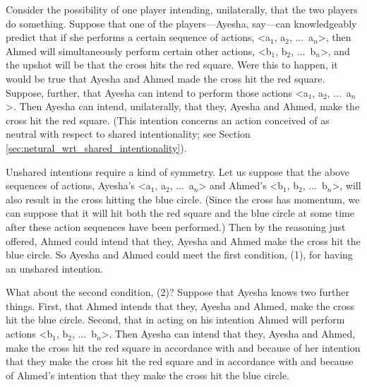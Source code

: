 \documentclass[12pt,\papersize]{extarticle}
\begin{document}
Consider the possibility of one player intending, unilaterally, that the two players do something.
Suppose that one of the players---Ayesha, say---can knowledgeably predict that if she performs a certain sequence of actions, <a$_1$, a$_2$, ...\ a$_n$>, then Ahmed will simultaneously perform certain other actions, <b$_1$, b$_2$, ...\ b$_n$>,
 and the upshot will be that the cross hits the red square.
Were this to happen, it would be true that Ayesha and Ahmed made the cross hit the red square.
Suppose, further, that Ayesha can intend to perform those actions <a$_1$, a$_2$, ...\ a$_n$>.
Then Ayesha can intend, unilaterally, that they, Ayesha and Ahmed, make the cross hit the red square.
(This intention concerns an action conceived of as neutral with respect to shared intentionality; see  Section \vref{sec:netural_wrt_shared_intentionality}).

Unshared intentions require a kind of symmetry.
Let us suppose that the above sequences of actions,
	Ayesha's <a$_1$, a$_2$, ...\ a$_n$>  and 
	Ahmed's <b$_1$, b$_2$, ...\ b$_n$>,
will also result in the cross hitting the blue circle. 
(Since the cross has momentum, we can suppose that it will hit both the red square and the blue circle at some time after these action sequences have been performed.)
Then by the reasoning just offered, Ahmed could intend that they, Ayesha and Ahmed make the cross hit the blue circle.
So Ayesha and Ahmed could meet the first condition, (1), for having an unshared intention.

What about the second condition, (2)?
Suppose that Ayesha knows two further things.
First, that Ahmed intends that they, Ayesha and Ahmed, make the cross hit the blue circle.
Second, that in acting on his intention Ahmed will perform actions <b$_1$, b$_2$, ...\ b$_n$>.
Then Ayesha can intend that they, Ayesha and Ahmed, make the cross hit the red square in accordance with and because of her intention that they make the cross hit the red square and in accordance with and because of Ahmed's intention that they make the cross hit the blue circle.
\end{document}

